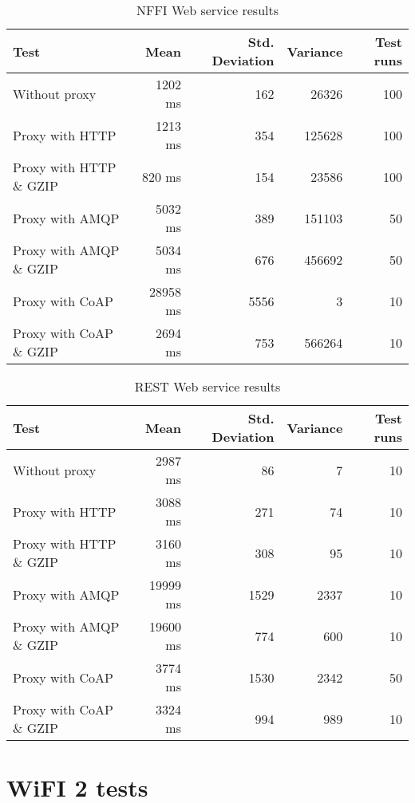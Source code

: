 \begin{appendices}
\begin{table}[H]
\begin{tabular}{| l | r | r | r | r |}
\hline
  \textbf{Test} & \textbf{Mean} & \textbf{Std. Deviation} & \textbf{Variance} & \textbf{Test runs}\\ \hline
  Without proxy & 1202 ms & 162 & 26326 & 100 \\ \hline
  Proxy with HTTP & 1213 ms & 354 & 125628 & 100 \\ \hline
  Proxy with HTTP \& GZIP & 820 ms & 154 & 23586 & 100 \\ \hline
  Proxy with AMQP & 5032 ms & 389 & 151103 & 50 \\ \hline
  Proxy with AMQP \& GZIP & 5034 ms & 676 & 456692 & 50\\ \hline
  Proxy with CoAP & 28958 ms & 5556 & 3 & 10 \\ \hline
  Proxy with CoAP \& GZIP & 2694 ms & 753 & 566264 & 10 \\ \hline
\end{tabular}
\caption{NFFI Web service results}
\end{table}


\begin{table}[H]
\begin{tabular}{| l | r | r | r | r |}
\hline
  \textbf{Test} & \textbf{Mean} & \textbf{Std. Deviation} & \textbf{Variance} & \textbf{Test runs}\\ \hline
  Without proxy & 2987 ms & 86 & 7 & 10 \\ \hline
  Proxy with HTTP & 3088 ms & 271 & 74 & 10 \\ \hline
  Proxy with HTTP \& GZIP & 3160 ms & 308 & 95 & 10 \\ \hline
  Proxy with AMQP & 19999 ms & 1529 & 2337 & 10 \\ \hline
  Proxy with AMQP \& GZIP & 19600 ms & 774 & 600 & 10\\ \hline
  Proxy with CoAP & 3774 ms & 1530 & 2342 & 50 \\ \hline
  Proxy with CoAP \& GZIP & 3324 ms & 994 & 989 & 10 \\ \hline
\end{tabular}
\caption{REST Web service results}
\end{table}




\section{WiFI 2 tests}


\end{appendices}
